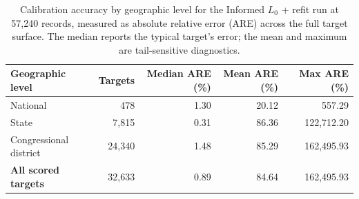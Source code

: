 \begin{table}[H]
\centering
{\tablefont
\begin{tabular}{lrrrr}
\toprule
Geographic level & Targets & Median ARE (\%) & Mean ARE (\%) & Max ARE (\%) \\
\midrule
National & 478 & 1.30 & 20.12 & 557.29 \\
State & 7{,}815 & 0.31 & 86.36 & 122{,}712.20 \\
Congressional district & 24{,}340 & 1.48 & 85.29 & 162{,}495.93 \\
\midrule
\textbf{All scored targets} & 32{,}633 & 0.89 & 84.64 & 162{,}495.93 \\
\bottomrule
\end{tabular}
}
\caption{Calibration accuracy by geographic level for the Informed $L_0$ + refit run at 57{,}240
records, measured as absolute relative error (ARE) across the full target surface. The median reports the
typical target's error; the mean and maximum are tail-sensitive diagnostics.}
\label{tab:calibration_accuracy}
\end{table}
